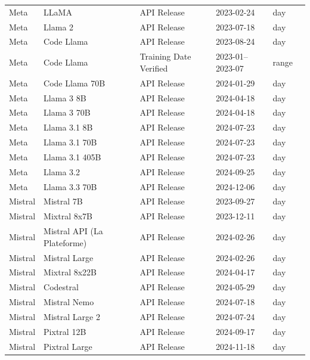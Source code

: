 \documentclass[a4paper,fleqn,longmktitle]{cas-sc}
\begin{document}
\begin{longtable}{p{2.2cm} p{3.4cm} p{3.0cm} p{2.3cm} p{1.6cm} p{2.0cm}}
Meta & LLaMA & API Release & 2023-02-24 & day & \cite{meta_llama_2023} \\
Meta & Llama 2 & API Release & 2023-07-18 & day & \cite{meta_llama2_2023} \\
Meta & Code Llama & API Release & 2023-08-24 & day & \cite{meta_code_llama_2023} \\
Meta & Code Llama & Training Date Verified & 2023-01--2023-07 & range & \cite{meta_code_llama_paper_2023} \\
Meta & Code Llama 70B & API Release & 2024-01-29 & day & \cite{meta_code_llama_2023} \\
Meta & Llama 3 8B & API Release & 2024-04-18 & day & \cite{meta_llama3_2024} \\
Meta & Llama 3 70B & API Release & 2024-04-18 & day & \cite{meta_llama3_2024} \\
Meta & Llama 3.1 8B & API Release & 2024-07-23 & day & \cite{meta_llama3_1_2024} \\
Meta & Llama 3.1 70B & API Release & 2024-07-23 & day & \cite{meta_llama3_1_2024} \\
Meta & Llama 3.1 405B & API Release & 2024-07-23 & day & \cite{meta_llama3_1_2024} \\
Meta & Llama 3.2 & API Release & 2024-09-25 & day & \cite{meta_llama3_2_2024} \\
Meta & Llama 3.3 70B & API Release & 2024-12-06 & day & \cite{huggingface_llama3_3_70b_2024} \\

Mistral & Mistral 7B & API Release & 2023-09-27 & day & \cite{mistral_mistral7b_2023} \\
Mistral & Mixtral 8x7B & API Release & 2023-12-11 & day & \cite{mistral_mixtral_8x7b_2023} \\
Mistral & Mistral API (La Plateforme) & API Release & 2024-02-26 & day & \cite{mistral_la_plateforme_2024} \\
Mistral & Mistral Large & API Release & 2024-02-26 & day & \cite{mistral_mistral_large_2024} \\
Mistral & Mixtral 8x22B & API Release & 2024-04-17 & day & \cite{mistral_mixtral_8x22b_2024} \\
Mistral & Codestral & API Release & 2024-05-29 & day & \cite{mistral_codestral_2024} \\
Mistral & Mistral Nemo & API Release & 2024-07-18 & day & \cite{mistral_nemo_2024} \\
Mistral & Mistral Large 2 & API Release & 2024-07-24 & day & \cite{mistral_mistral_large_2_2024} \\
Mistral & Pixtral 12B & API Release & 2024-09-17 & day & \cite{mistral_pixtral_12b_2024} \\
Mistral & Pixtral Large & API Release & 2024-11-18 & day & \cite{mistral_pixtral_large_2024} \\

\end{longtable}
\end{document}
